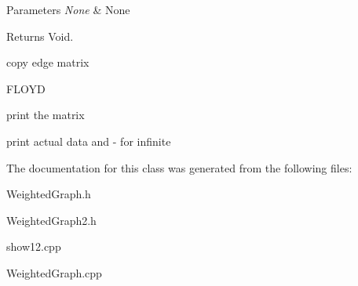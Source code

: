 \begin{DoxyParams}{Parameters}
{\em None} & None \\
\hline
\end{DoxyParams}
\begin{DoxyReturn}{Returns}
Void. 
\end{DoxyReturn}
copy edge matrix

F\+L\+O\+Y\+D

print the matrix

print actual data and -\/ for infinite 

The documentation for this class was generated from the following files\+:\begin{DoxyCompactItemize}
\item 
Weighted\+Graph.\+h\item 
Weighted\+Graph2.\+h\item 
show12.\+cpp\item 
Weighted\+Graph.\+cpp\end{DoxyCompactItemize}
